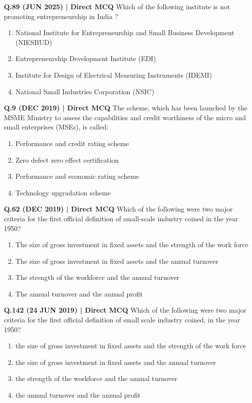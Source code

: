 \documentclass{article}
\begin{document}
\textbf{Q.89 (JUN 2025) | Direct MCQ}
Which of the following institute is not promoting entrepreneurship in India ?
\begin{enumerate}[label=(\arabic*)]
    \item National Institute for Entrepreneurship and Small Business Development (NIESBUD)
    \item Entrepreneurship Development Institute (EDI)
    \item Institute for Design of Electrical Measuring Instruments (IDEMI)
    \item National Small Industries Corporation (NSIC)
\end{enumerate}

\textbf{Q.9 (DEC 2019) | Direct MCQ}
The scheme, which has been launched by the MSME Ministry to assess the capabilities and credit worthiness of the micro and small enterprises (MSEs), is called:
\begin{enumerate}[label=(\arabic*)]
    \item Performance and credit rating scheme
    \item Zero defect zero effect certification
    \item Performance and economic rating scheme
    \item Technology upgradation scheme
\end{enumerate}

\textbf{Q.62 (DEC 2019) | Direct MCQ}
Which of the following were two major criteria for the first official definition of small-scale industry coined in the year 1950?
\begin{enumerate}[label=(\arabic*)]
    \item The size of gross investment in fixed assets and the strength of the work force
    \item The size of gross investment in fixed assets and the annual turnover
    \item The strength of the workforce and the annual turnover
    \item The annual turnover and the annual profit
\end{enumerate}

\textbf{Q.142 (24 JUN 2019) | Direct MCQ}
Which of the following were two major criteria for the first official definition of small scale industry coined, in the year 1950?
\begin{enumerate}[label=(\arabic*)]
    \item the size of gross investment in fixed assets and the strength of the work force
    \item the size of gross investment in fixed assets and the annual turnover
    \item the strength of the workforce and the annual turnover
    \item the annual turnover and the annual profit
\end{enumerate}
\end{document}
